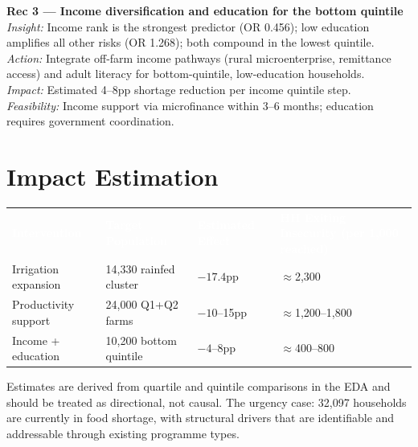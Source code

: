 \documentclass[11pt,a4paper]{article}
\newcommand{\tH}[1]{\cellcolor{rhoRed}\textcolor{white}{\textbf{#1}}}
\begin{document}
\vspace{7pt}

\begin{findingbox}
\textbf{Rec 3 — Income diversification and education for the bottom quintile}\\[4pt]
\textit{Insight:} Income rank is the strongest predictor (OR 0.456); low education amplifies all other risks (OR 1.268); both compound in the lowest quintile.\\[3pt]
\textit{Action:} Integrate off-farm income pathways (rural microenterprise, remittance access) and adult literacy for bottom-quintile, low-education households.\\[3pt]
\textit{Impact:} Estimated 4--8pp shortage reduction per income quintile step.\\[3pt]
\textit{Feasibility:} Income support via microfinance within 3--6 months; education requires government coordination.
\end{findingbox}

\newpage

\section{Impact Estimation}

\begin{tabularx}{\linewidth}{@{}p{3.4cm} p{3.0cm} p{2.4cm} L@{}}
  \tH{Intervention} & \tH{Target Population} & \tH{Estimated Effect} & \tH{HH Exiting Insecurity (per 1,000 reached)} \\
  Irrigation expansion  & 14,330 rainfed cluster  & $-17.4$pp   & $\approx$2,300 \\
  Productivity support  & 24,000 Q1+Q2 farms      & $-10$--15pp & $\approx$1,200--1,800 \\
  Income + education    & 10,200 bottom quintile  & $-4$--8pp   & $\approx$400--800 \\
  \bottomrule
\end{tabularx}

Estimates are derived from quartile and quintile comparisons in the EDA and should be treated as directional, not causal. The urgency case: 32,097 households are currently in food shortage, with structural drivers that are identifiable and addressable through existing programme types.

\vspace{10pt}
\end{document}
